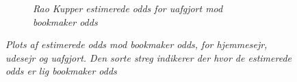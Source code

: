 \documentclass[11pt,a4paper]{article}
\begin{document}
\begin{figure}[h!]
\begin{subfigure}[b]{0.4\linewidth}
    \caption{\textit{Rao Kupper estimerede odds for uafgjort mod bookmaker odds}}
    \label{fig:StatUafgjortOdds}  
    \end{subfigure}
\caption{\textit{Plots af estimerede odds mod bookmaker odds, for hjemmesejr, udesejr og uafgjort. Den sorte streg indikerer der hvor de estimerede odds er lig bookmaker odds}}
  \label{fig:OddsPlot}
\end{figure}
\newpage
\printbibliography %
\end{document}
